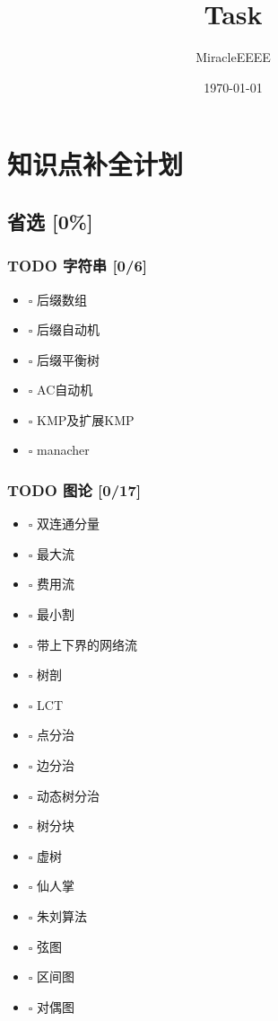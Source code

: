 \documentclass[11pt]{article}
\author{MiracleEEEE}
\date{\today}
\title{Task}
\begin{document}
\maketitle
\tableofcontents


\section{知识点补全计划}
\label{sec-1}

\subsection{省选 [0\%]}
\label{sec-1-1}

\subsubsection{{\bfseries\sffamily TODO} 字符串 [0/6]}
\label{sec-1-1-1}

\begin{itemize}
\item $\square$ 后缀数组
\item $\square$ 后缀自动机
\item $\square$ 后缀平衡树
\item $\square$ AC自动机
\item $\square$ KMP及扩展KMP
\item $\square$ manacher
\end{itemize}

\subsubsection{{\bfseries\sffamily TODO} 图论 [0/17]}
\label{sec-1-1-2}

\begin{itemize}
\item $\square$ 双连通分量
\item $\square$ 最大流
\item $\square$ 费用流
\item $\square$ 最小割
\item $\square$ 带上下界的网络流
\item $\square$ 树剖
\item $\square$ LCT
\item $\square$ 点分治
\item $\square$ 边分治
\item $\square$ 动态树分治
\item $\square$ 树分块
\item $\square$ 虚树
\item $\square$ 仙人掌
\item $\square$ 朱刘算法
\item $\square$ 弦图
\item $\square$ 区间图
\item $\square$ 对偶图
\end{itemize}
\end{document}
